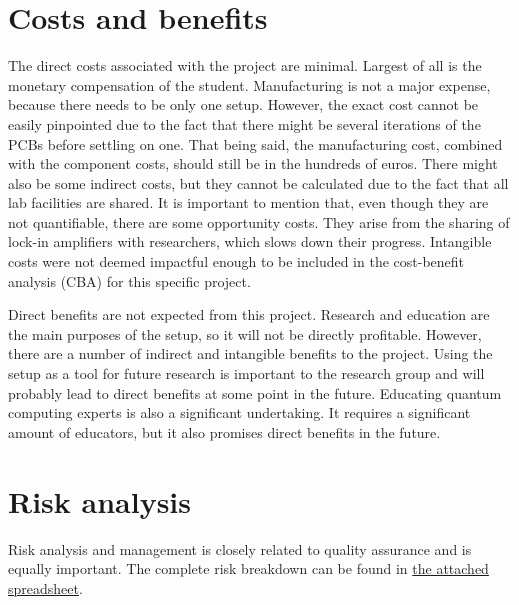 \documentclass{report}
\begin{document}
		
		
	
	
	
	
	
	\chapter{Costs and benefits}
	The direct costs associated with the project are minimal. Largest of all is the monetary compensation of the student. Manufacturing is not a major expense, because there needs to be only one setup. However, the exact cost cannot be easily pinpointed due to the fact that there might be several iterations of the PCBs before settling on one. That being said, the manufacturing cost, combined with the component costs, should still be in the hundreds of euros. There might also be some indirect costs, but they cannot be calculated due to the fact that all lab facilities are shared. It is important to mention that, even though they are not quantifiable, there are some opportunity costs. They arise from the sharing of lock-in amplifiers with researchers, which slows down their progress. Intangible costs were not deemed impactful enough to be included in the cost-benefit analysis (CBA) for this specific project. 
	
	Direct benefits are not expected from this project. Research and education are the main purposes of the setup, so it will not be directly profitable. However, there are a number of indirect and intangible benefits to the project. Using the setup as a tool for future research is important to the research group and will probably lead to direct benefits at some point in the future. Educating quantum computing experts is also a significant undertaking. It requires a significant amount of educators, but it also promises direct benefits in the future.
	
	\chapter{Risk analysis}
	Risk analysis and management is closely related to quality assurance and is equally important. The complete risk breakdown can be found in \href{run: ./risk_analysis.xlsm}{the attached spreadsheet}. 
	
	
	
	\printbibliography
	
\end{document}
